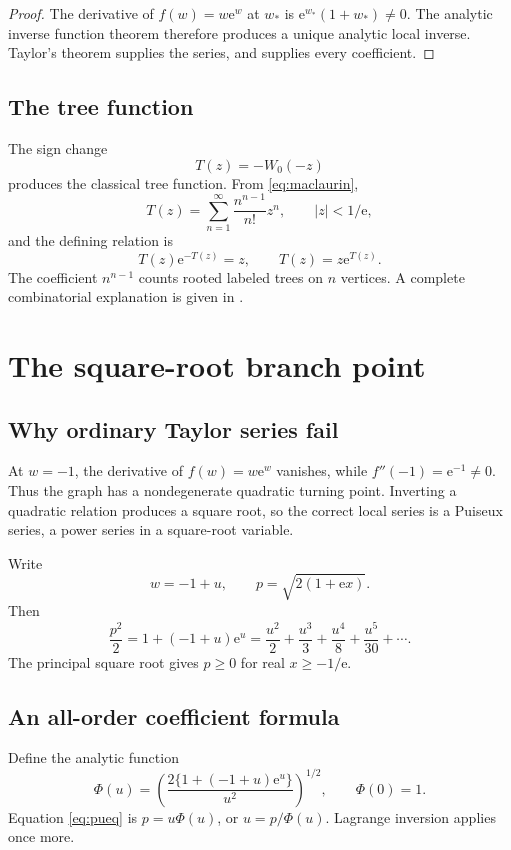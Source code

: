 \documentclass[11pt,openany]{book}
\newcommand{\e}{\mathrm{e}}
\newcommand{\Wzero}{W_0}
\newcommand{\abs}[1]{\left|#1\right|}
\theoremstyle{plain}
\theoremstyle{definition}
\theoremstyle{remark}
\begin{document}
\begin{proof}
The derivative of \(f(w)=w\e^w\) at \(w_*\) is
\(\e^{w_*}(1+w_*)\ne0\).  The analytic inverse function theorem therefore
produces a unique analytic local inverse.  Taylor's theorem supplies the
series, and  supplies every coefficient.
\end{proof}

\section{The tree function}
The sign change
\[
             T(z)=-\Wzero(-z)
\]
produces the classical tree function.  From \eqref{eq:maclaurin},
\begin{equation}\label{eq:treeseries}
       T(z)=\sum_{n=1}^{\infty}\frac{n^{n-1}}{n!}z^n,
       \qquad \abs z<1/\e,
\end{equation}
and the defining relation is
\[
             T(z)\e^{-T(z)}=z,
             \qquad T(z)=z\e^{T(z)}.
\]
The coefficient \(n^{n-1}\) counts rooted labeled trees on \(n\) vertices.
A complete combinatorial explanation is given in .

\chapter{The square-root branch point}\label{chap:branchpoint}

\section{Why ordinary Taylor series fail}
At \(w=-1\), the derivative of \(f(w)=w\e^w\) vanishes, while
\(f''(-1)=\e^{-1}\ne0\).  Thus the graph has a nondegenerate quadratic
turning point.  Inverting a quadratic relation produces a square root, so the
correct local series is a Puiseux series, a power series in a square-root
variable.

Write
\[
       w=-1+u,
       \qquad
       p=\sqrt{2(1+\e x)}.
\]
Then
\begin{equation}\label{eq:pueq}
 \frac{p^2}{2}=1+(-1+u)\e^u
 =\frac{u^2}{2}+\frac{u^3}{3}
   +\frac{u^4}{8}+\frac{u^5}{30}+\cdots.
\end{equation}
The principal square root gives \(p\ge0\) for real
\(x\ge-1/\e\).

\section{An all-order coefficient formula}
Define the analytic function
\begin{equation}\label{eq:phibranch}
 \Phi(u)=
 \left(\frac{2\{1+(-1+u)\e^u\}}{u^2}\right)^{1/2},
 \qquad \Phi(0)=1.
\end{equation}
Equation \eqref{eq:pueq} is \(p=u\Phi(u)\), or
\(u=p/\Phi(u)\).  Lagrange inversion applies once more.
\end{document}
